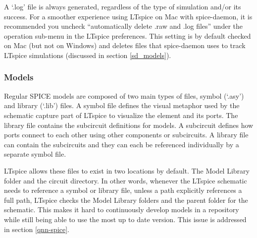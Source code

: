 \documentclass[]{article}
\newcommand{\todoidea}[2][]{}
\newcommand{\ccf}[1]{`\textsf{#1}'}
\begin{document}
A \ccf{.log} file is always generated, 
regardless of the type of simulation and/or its success. For a smoother experience using LTspice on Mac with spice-daemon, it is
recommended you uncheck ``automatically delete .raw and .log files'' under the operation sub-menu
in the LTspice preferences. This setting is by default checked on Mac (but not on Windows) and
deletes files that spice-daemon uses to track LTspice simulations (discussed in section \ref{sd_models}).

\subsubsection{Models}

Regular SPICE models are composed of two main types of files, symbol (\ccf{.asy}) and library
(\ccf{.lib}) files. A symbol file defines the visual metaphor used by the schematic capture
part of LTspice to visualize the element and its ports. The library file contains the subcircuit
definitions for models. A subcircuit defines how ports connect to each other using other components
or subcircuits. A library file can contain the subcircuits and they can each be referenced individually
by a separate symbol file.

LTspice allows these files to exist in two locations by default. The Model Library folder and the circuit directory. In other words, whenever the LTspice schematic needs to reference a symbol or
library file, unless a path explicitly references a full path, LTspice checks the Model Library folders 
and the parent folder for the schematic. This makes it hard to continuously develop models in a repository
while still being able to use the most up to date version. This issue is addressed in section \ref{qnn-spice}.









\end{document}
